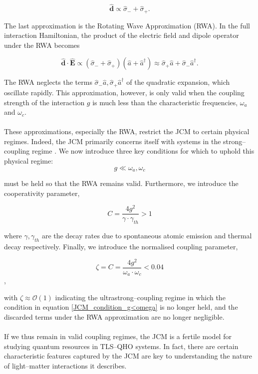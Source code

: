 \documentclass[12pt]{article}
\begin{document}
\begin{equation*}
    \boldsymbol{\hat{d}}  \propto \hat{\sigma}_{-} + \hat{\sigma}_{+}.
\end{equation*}

The last approximation is the Rotating Wave Approximation (RWA). In the full interaction Hamiltonian, the product of the electric field and dipole operator under the RWA becomes

\begin{equation}
    \boldsymbol{\hat{d}} \cdot \boldsymbol{\hat{E}} \propto (\hat{\sigma}_{-} + \hat{\sigma}_{+})(\hat{a} + \hat{a}^\dagger) \approx \hat{\sigma}_{+}\hat{a} +\hat{\sigma}_{-}\hat{a}^\dagger. 
\end{equation}

The RWA neglects the terms $\hat{\sigma}_{-}\hat{a}, \hat{\sigma}_{+}\hat{a}^\dagger$ of the quadratic expansion, which oscillate rapidly. This approximation, however, is only valid when the coupling strength of the interaction $g$ is much less than the characteristic frequencies, $\omega_a$ and $\omega_c$. \\
\\
These approximations, especially the RWA, restrict the JCM to certain physical regimes. Indeed, the JCM primarily concerns itself with systems in the strong--coupling regime \cite{General2024-JCM_relevance}. We now introduce three key conditions for which to uphold this physical regime:
\begin{equation} \label{JCM_condition_g<omega}
    g \ll \omega_a, \omega_c 
\end{equation} 

must be held so that the RWA remains valid. Furthermore, we introduce the cooperativity parameter,

\begin{equation} \label{JCM_condition_cooperativity}
    C = \frac{4g^2}{\gamma\cdot\gamma_{\scriptscriptstyle th}} > 1
\end{equation}

where $\gamma, \gamma_{\scriptscriptstyle th}$ are the decay rates due to spontaneous atomic emission and thermal decay respectively. Finally, we introduce the normalised coupling parameter, 

\begin{equation} \label{JCM_condition_norm_coupling}
    \zeta = C = \frac{4g^2}{\omega_a\cdot\omega_c} < 0.04
\end{equation}, 

with $\zeta \approx \mathcal{O}(1)$ indicating the ultrastrong--coupling regime in which the condition in equation \eqref{JCM_condition_g<omega} is no longer held, and the discarded terms under the RWA approximation are no longer negligible.\\
\\
If we thus remain in valid coupling regimes, the JCM is a fertile model for studying quantum resources in TLS--QHO systems. In fact, there are certain characteristic features captured by the JCM are key to understanding the nature of light--matter interactions it describes. 
\end{document}
